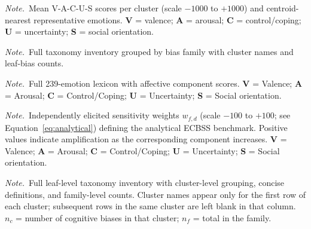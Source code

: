 \documentclass[12pt,a4paper]{article}
\newcommand{\ecbss}{\textsc{ECBSS}}
\newcommand{\vacus}{V-A-C-U-S}
\newcommand{\tabnote}[1]{%
  \par\vspace{3pt}\noindent%
  \begin{minipage}{0.96\linewidth}\footnotesize\raggedright\textit{Note.}~#1\end{minipage}%
}
\begin{document}
\begin{table}[htb]
  \raggedright
  \small
  \caption{Emotion-cluster profiles and representative states}
  \label{tab:s5-clusters}
  \resizebox{\textwidth}{!}{}
  \tabnote{Mean \vacus{} scores per cluster (scale $-1000$ to $+1000$) and centroid-nearest representative emotions. \textbf{V} = valence; \textbf{A} = arousal; \textbf{C} = control/coping; \textbf{U} = uncertainty; \textbf{S} = social orientation.}
\end{table}

\clearpage
\begingroup
\small
\raggedright

\endgroup
\tabnote{Full taxonomy inventory grouped by bias family with cluster names and leaf-bias counts.}

\clearpage
\begingroup
\footnotesize
\raggedright

\endgroup
\tabnote{Full 239-emotion lexicon with affective component scores. \textbf{V} = Valence; \textbf{A} = Arousal; \textbf{C} = Control/Coping; \textbf{U} = Uncertainty; \textbf{S} = Social orientation.}

\clearpage
\begin{table}[H]
  \raggedright
  \small
  \caption{Bias-family sensitivity weights across affective components}
  \label{tab:s9-sensitivity}
  \resizebox{\textwidth}{!}{}
  \tabnote{Independently elicited sensitivity weights $w_{f,d}$ (scale $-100$ to $+100$; see Equation~\ref{eq:analytical}) defining the analytical \ecbss{} benchmark. Positive values indicate amplification as the corresponding component increases. \textbf{V} = Valence; \textbf{A} = Arousal; \textbf{C} = Control/Coping; \textbf{U} = Uncertainty; \textbf{S} = Social orientation.}
\end{table}

\begingroup
\small
\raggedright

\endgroup
\tabnote{Full leaf-level taxonomy inventory with cluster-level grouping, concise definitions, and family-level counts. Cluster names appear only for the first row of each cluster; subsequent rows in the same cluster are left blank in that column. $n_c$ = number of cognitive biases in that cluster; $n_f$ = total in the family.}
\end{document}
